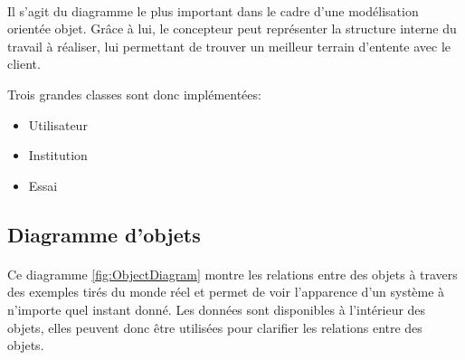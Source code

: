     \paragraph{}
    Il s'agit du diagramme le plus important dans le cadre 
    d'une modélisation orientée objet. Grâce à lui, le concepteur peut 
    représenter la structure interne du travail à réaliser, lui 
    permettant de trouver un meilleur terrain d'entente avec le client.
    \par 
    Trois grandes classes sont donc implémentées:
    \begin{itemize}
        \item Utilisateur
        \item Institution
        \item Essai 
    \end{itemize}
    \par 
    [TO BE CONTINUED - Take a look ds le fichier mdj]

    \subsection{Diagramme d'objets}
    \paragraph{}
    Ce diagramme \ref{fig:ObjectDiagram} montre les relations entre des objets à travers 
    des exemples tirés du monde réel et permet de voir 
    l'apparence d'un système à n'importe quel instant donné. 
    Les données sont disponibles à l'intérieur des objets, 
    elles peuvent donc être utilisées pour clarifier les 
    relations entre des objets.
